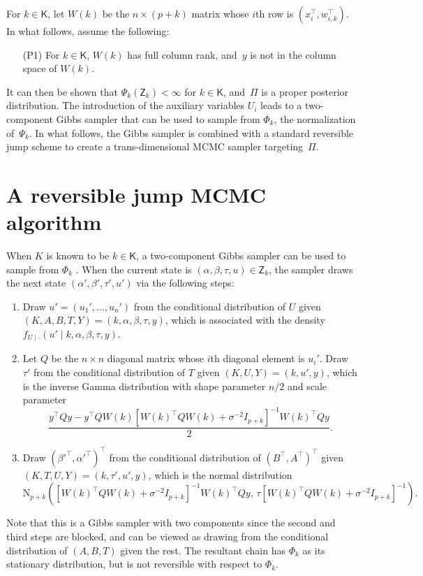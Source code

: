 \documentclass[12pt]{article}
\makeatletter
\def\namedlabel#1#2{\begingroup
	#2%
	\def\@currentlabel{#2}%
	\phantomsection\label{#1}\endgroup
}
\newcommand{\Z}{\mathsf{Z}}
\makeatother
\begin{document}
For $k \in \mathsf{K}$, let $W(k)$ be the $n \times (p+k)$ matrix whose $i$th row is $(x_i^{\top}, w_{i,k}^{\top})$.
In what follows, assume the following:
\begin{enumerate}
	\item [\namedlabel{P1}{(P1)}] For $k \in \mathsf{K}$, $W(k)$ has full column rank, and~$y$ is not in the column space of $W(k)$.
\end{enumerate}
It can then be shown that $\Psi_k(\Z_k) < \infty$ for $k \in \mathsf{K}$, and~$\Pi$ is a proper posterior distribution.
The introduction of the auxiliary variables $U_i$ leads to a two-component Gibbs sampler that can be used to sample from $\Phi_k$, the normalization of~$\Psi_k$. 
In what follows, the Gibbs sampler is combined with a standard reversible jump scheme to create a trans-dimensional MCMC sampler targeting~$\Pi$.


\section{A reversible jump MCMC algorithm} \label{sssec:autogibbs}

When $K$ is known to be $k \in \mathsf{K}$, a two-component Gibbs sampler can be used to sample from $\Phi_k$ \citep{choi2013analysis}.
When the current state is $(\alpha,\beta,\tau,u) \in \Z_k$, the sampler draws the next state $(\alpha',\beta',\tau',u')$ via the following steps:
\begin{enumerate}
	\item Draw $u' = (u_1', \dots,u_n')$ from the conditional distribution of $U$ given $(K,A,B,T,Y) = (k, \alpha, \beta, \tau,y)$, which is associated with the density $f_{U \mid \cdot}(u' \mid k, \alpha, \beta, \tau, y)$.
	\item 
	Let $Q $ be the $n \times n$ diagonal matrix whose $i$th diagonal element is $u_i'$.
	Draw $\tau'$ from the conditional distribution of $T$ given $(K,U,Y) = (k, u', y)$, which is the inverse Gamma distribution with shape parameter $n/2$ and scale parameter
	\[
	\frac{y^{\top} Q y - y^{\top} Q W(k) [W(k)^{\top} Q W(k) + \sigma^{-2} I_{p+k}]^{-1} W(k)^{\top} Q y }{2}.
	\]
	\item 
	Draw $(\beta'^{\top}, \alpha'^{\top})^{\top}$ from the conditional distribution of $(B^{\top}, A^{\top})^{\top}$ given $(K,T,U,Y) = (k,\tau', u', y)$, which is the normal distribution
	\[
	\mbox{N}_{p+k} \left( [W(k)^{\top} Q W(k) + \sigma^{-2} I_{p+k}]^{-1} W(k)^{\top} Q y, \, \tau [W(k)^{\top} Q W(k) + \sigma^{-2} I_{p+k}]^{-1} \right).
	\]
\end{enumerate}
Note that this is a Gibbs sampler with two components since the second and third steps are blocked, and can be viewed as drawing from the conditional distribution of $(A,B,T)$ given the rest.
{ The resultant chain has $\Phi_k$ as its stationary distribution, but is not reversible with respect to $\Phi_k$.}
\end{document}
